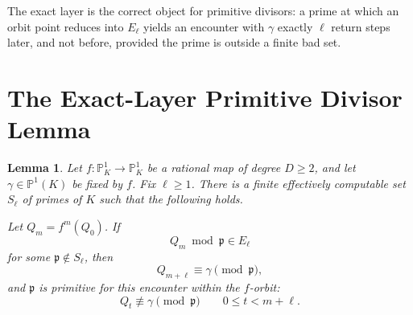 \documentclass[11pt]{article}
\newtheorem{lemma}[theorem]{Lemma}
\begin{document}
The exact layer is the correct object for primitive divisors: a prime at which an orbit point reduces into \(E_\ell\) yields an encounter with \(\gamma\) exactly \(\ell\) return steps later, and not before, provided the prime is outside a finite bad set.

\section{The Exact-Layer Primitive Divisor Lemma}

\begin{lemma}
Let \(f:\mathbb P^1_K\to\mathbb P^1_K\) be a rational map of degree \(D\ge2\), and let \(\gamma\in\mathbb P^1(K)\) be fixed by \(f\). Fix \(\ell\ge1\). There is a finite effectively computable set \(S_\ell\) of primes of \(K\) such that the following holds.

Let \(Q_m=f^m(Q_0)\). If
\[
Q_m\bmod\mathfrak p\in E_\ell
\]
for some \(\mathfrak p\notin S_\ell\), then
\[
Q_{m+\ell}\equiv\gamma\pmod{\mathfrak p},
\]
and \(\mathfrak p\) is primitive for this encounter within the \(f\)-orbit:
\[
Q_t\not\equiv\gamma\pmod{\mathfrak p}
\qquad
0\le t<m+\ell.
\]
\end{lemma}
\end{document}
